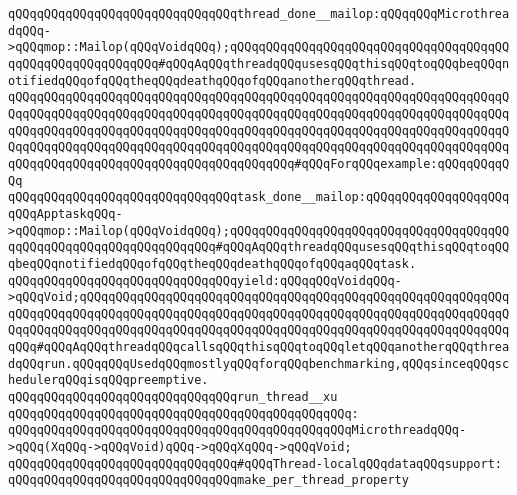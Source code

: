 \newline
\newline
\verb|qQQqqQQqqQQqqQQqqQQqqQQqqQQqqQQqthread_done__mailop:qQQqqQQqMicrothreadqQQq->qQQqmop::Mailop(qQQqVoidqQQq);qQQqqQQqqQQqqQQqqQQqqQQqqQQqqQQqqQQqqQQqqQQqqQQqqQQqqQQqqQQq#qQQqAqQQqthreadqQQqusesqQQqthisqQQqtoqQQqbeqQQqnotifiedqQQqofqQQqtheqQQqdeathqQQqofqQQqanotherqQQqthread.|\newline
\verb|qQQqqQQqqQQqqQQqqQQqqQQqqQQqqQQqqQQqqQQqqQQqqQQqqQQqqQQqqQQqqQQqqQQqqQQqqQQqqQQqqQQqqQQqqQQqqQQqqQQqqQQqqQQqqQQqqQQqqQQqqQQqqQQqqQQqqQQqqQQqqQQqqQQqqQQqqQQqqQQqqQQqqQQqqQQqqQQqqQQqqQQqqQQqqQQqqQQqqQQqqQQqqQQqqQQqqQQqqQQqqQQqqQQqqQQqqQQqqQQqqQQqqQQqqQQqqQQqqQQqqQQqqQQqqQQqqQQqqQQqqQQqqQQqqQQqqQQqqQQqqQQqqQQqqQQqqQQqqQQq#qQQqForqQQqexample:qQQqqQQqqQQq|\newline
\newline
\verb|qQQqqQQqqQQqqQQqqQQqqQQqqQQqqQQqtask_done__mailop:qQQqqQQqqQQqqQQqqQQqqQQqApptaskqQQq->qQQqmop::Mailop(qQQqVoidqQQq);qQQqqQQqqQQqqQQqqQQqqQQqqQQqqQQqqQQqqQQqqQQqqQQqqQQqqQQqqQQqqQQqqQQq#qQQqAqQQqthreadqQQqusesqQQqthisqQQqtoqQQqbeqQQqnotifiedqQQqofqQQqtheqQQqdeathqQQqofqQQqaqQQqtask.|\newline
\newline
\verb|qQQqqQQqqQQqqQQqqQQqqQQqqQQqqQQqyield:qQQqqQQqVoidqQQq->qQQqVoid;qQQqqQQqqQQqqQQqqQQqqQQqqQQqqQQqqQQqqQQqqQQqqQQqqQQqqQQqqQQqqQQqqQQqqQQqqQQqqQQqqQQqqQQqqQQqqQQqqQQqqQQqqQQqqQQqqQQqqQQqqQQqqQQqqQQqqQQqqQQqqQQqqQQqqQQqqQQqqQQqqQQqqQQqqQQqqQQqqQQqqQQqqQQqqQQqqQQqqQQqqQQq#qQQqAqQQqthreadqQQqcallsqQQqthisqQQqtoqQQqletqQQqanotherqQQqthreadqQQqrun.qQQqqQQqUsedqQQqmostlyqQQqforqQQqbenchmarking,qQQqsinceqQQqschedulerqQQqisqQQqpreemptive.|\newline
\newline
\newline
\verb|qQQqqQQqqQQqqQQqqQQqqQQqqQQqqQQqrun_thread__xu|\newline
\verb|qQQqqQQqqQQqqQQqqQQqqQQqqQQqqQQqqQQqqQQqqQQqqQQq:|\newline
\verb|qQQqqQQqqQQqqQQqqQQqqQQqqQQqqQQqqQQqqQQqqQQqqQQqMicrothreadqQQq->qQQq(XqQQq->qQQqVoid)qQQq->qQQqXqQQq->qQQqVoid;|\newline
\newline
\verb|qQQqqQQqqQQqqQQqqQQqqQQqqQQqqQQq#qQQqThread-localqQQqdataqQQqsupport:|\newline
\newline
\verb|qQQqqQQqqQQqqQQqqQQqqQQqqQQqqQQqmake_per_thread_property|\newline
